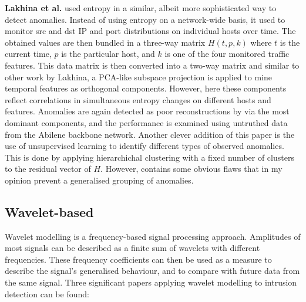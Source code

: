 \documentclass[a4paper,12pt,twoside]{report}
\begin{document}
\textbf{Lakhina et al.} \cite{lakhina2005mining} used entropy in a similar, albeit more sophisticated way to detect anomalies. Instead of using entropy on a network-wide basis, it used to monitor src and dst IP and port distributions on individual hosts over time. The obtained values are then bundled in a three-way matrix $H(t,p,k)$ where $t$ is the current time, $p$ is the particular host, and $k$ is one of the four monitored traffic features. This data matrix is then converted into a two-way matrix and similar to other work by Lakhina, a PCA-like subspace projection is applied to mine temporal features as orthogonal components. However, here these components reflect correlations in simultaneous entropy changes on different hosts and features. Anomalies are again detected as poor reconstructions by via the most dominant components, and the performance is examined using untruthed data from the Abilene backbone network. Another clever addition of this paper is the use of unsupervised learning to identify different types of observed anomalies. This is done by applying hierarchichal clustering with a fixed number of clusters to the residual vector of $H$. However, contains some obvious flaws that in my opinion prevent a generalised grouping of anomalies.


\subsection{Wavelet-based}

Wavelet modelling is a frequency-based signal processing approach. Amplitudes of most signals can be described as a finite sum of wavelets with different frequencies. These frequency coefficients can then be used as a measure to describe the signal's generalised behaviour, and to compare with future data from the same signal. Three significant papers applying wavelet modelling to intrusion detection can be found:

\end{document}
